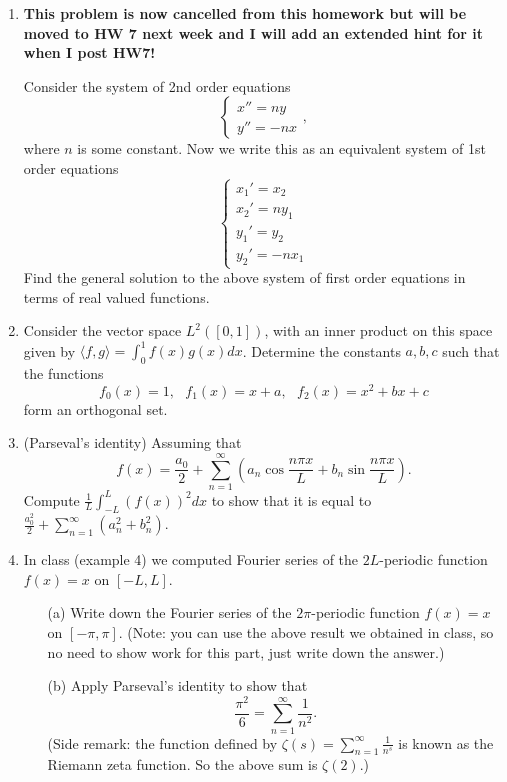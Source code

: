 \documentclass[11pt]{article}
\theoremstyle{definition}
\begin{document}
\begin{enumerate}[leftmargin=*]
\item \textbf{This problem is now cancelled from this homework but will be moved to HW 7 next week and I will add an extended hint for it when I post HW7!} 

Consider the system of 2nd order equations
$$
\begin{cases}
x''=ny\\
y''=-nx
\end{cases},
$$
where $n$ is some constant.  Now we write this as an equivalent system of 1st order equations
$$
\begin{cases}
x_1'=x_2\\
x_2'=ny_1\\
y_1'=y_2\\
y_2'=-nx_1
\end{cases}
$$
Find the general solution to the above system of first order equations in terms of real valued functions.\\






\item Consider the vector space $L^2([0,1])$, with an inner product on this space given by $\langle f, g\rangle=\int_0^1f(x)g(x)dx$.   Determine the constants $a,b,c$ such that the functions 
\[f_0(x)=1,\ \ \  f_1(x)=x+a, \ \ \ f_2(x)=x^2+bx+c\]
form an orthogonal set.\\

\item (Parseval's identity) Assuming that 
\[
f(x)=\frac{a_0}{2}+\sum_{n=1}^{\infty}\left(a_n\cos\frac{n\pi x}{L}+b_n\sin\frac{n\pi x}{L}\right).
\] Compute 
$\frac{1}{L}\int_{-L}^{L} (f(x))^2 dx$ to show that it is equal to $\frac{a_0^2}{2}+\sum_{n=1}^\infty (a_n^2+b_n^2)$.\\ 

\item In class (example 4) we computed Fourier series of the $2L$-periodic function $f(x)=x$ on $[-L, L]$.  
\begin{itemize}
\item[(a)] Write down the Fourier series of the $2\pi$-periodic function $f(x)=x$ on $[-\pi, \pi]$.  (Note: you can use the above result we obtained in class, so no need to show work for this part, just write down the answer.)\\
\item[(b)]  Apply Parseval's identity to show that 
\[\frac{\pi^2}{6}=\sum_{n=1}^\infty \frac{1}{n^2}.\]
(Side remark: the function defined by $\zeta(s)=\sum_{n=1}^\infty \frac{1}{n^s}$ is known as the Riemann zeta function.  So the above sum is $\zeta(2)$.)


\end{itemize}
\end{enumerate}
\end{document}
